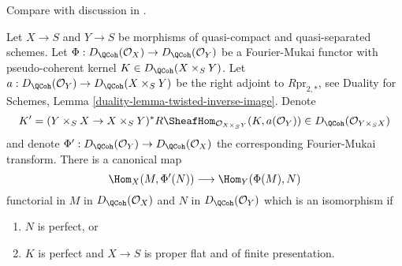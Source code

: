 \begin{lemma}
\label{lemma-fourier-mukai-right-adjoint}
\begin{reference}
Compare with discussion in \cite{Rizzardo}.
\end{reference}
Let $X \to S$ and $Y \to S$ be morphisms of quasi-compact and quasi-separated
schemes. Let $\Phi : D_\QCoh(\mathcal{O}_X) \to D_\QCoh(\mathcal{O}_Y)$
be a Fourier-Mukai functor with pseudo-coherent kernel
$K \in D_\QCoh(X \times_S Y)$.
Let $a : D_\QCoh(\mathcal{O}_Y) \to  D_\QCoh(X \times_S Y)$
be the right adjoint to $R\text{pr}_{2, *}$, see
Duality for Schemes, Lemma \ref{duality-lemma-twisted-inverse-image}.
Denote
$$
K' = (Y \times_S X \to X \times_S Y)^*
R\SheafHom_{\mathcal{O}_{X \times_S Y}}(K, a(\mathcal{O}_Y)) \in
D_\QCoh(\mathcal{O}_{Y \times_S X})
$$
and denote $\Phi' : D_\QCoh(\mathcal{O}_Y) \to D_\QCoh(\mathcal{O}_X)$
the corresponding Fourier-Mukai transform. There is a canonical map
$$
\Hom_X(M, \Phi'(N)) \longrightarrow \Hom_Y(\Phi(M), N)
$$
functorial in $M$ in $D_\QCoh(\mathcal{O}_X)$ and $N$ in
$D_\QCoh(\mathcal{O}_Y)$ which is an isomorphism if
\begin{enumerate}
\item $N$ is perfect, or
\item $K$ is perfect and $X \to S$ is proper flat and of finite presentation.
\end{enumerate}
\end{lemma}

